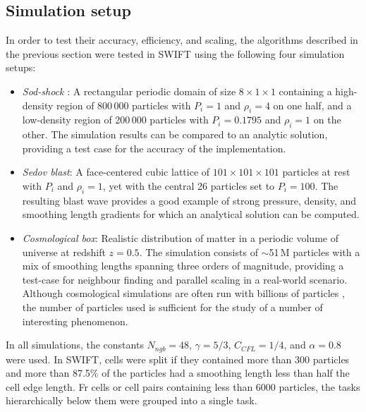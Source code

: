 \documentclass[final]{siamltex}
\begin{document}
\subsection{Simulation setup}

In order to test their accuracy, efficiency, and scaling,
the algorithms described in the previous section
were tested in SWIFT using the following four
simulation setups:
%
\begin{itemize}
    \item {\em Sod-shock} \cite{ref:Sod1978}: A rectangular periodic
        domain of size $8\times 1 \times 1$ containing a
        high-density region of
        800\,000 particles with $P_i=1$ and $\rho_i=4$ on one half,
        and a low-density region of 200\,000
        particles with $P_i=0.1795$ and $\rho_i=1$ on the other.
        The simulation results can be compared to an analytic
        solution, providing a test case for the accuracy of the
        implementation.
    \item {\em Sedov blast}: A face-centered cubic lattice of
        $101\times 101\times 101$
        particles at rest with $P_i$ and $\rho_i=1$, yet with the
        central 26 particles set to
        $P_i=100$.
        The resulting blast wave provides a good example of
        strong pressure, density, and smoothing length gradients
        for which an analytical solution can be computed.
    \item {\em Cosmological box}: Realistic distribution of matter
        in a periodic volume of universe at redshift $z=0.5$.
        The simulation consists
        of $\sim$51\,M particles with
        a mix of smoothing lengths spanning three orders of magnitude,
        providing a test-case for neighbour finding and parallel
        scaling in a real-world scenario.
        Although cosmological simulations are often run with
        billions of particles \cite{ref:Springel2005}, the number of
        particles used is sufficient for the study of a number of
        interesting phenomenon.
\end{itemize}
%
In all simulations, the constants $N_{ngb}=48$, $\gamma=5/3$,
$C_{CFL}=1/4$, and $\alpha = 0.8$ were used.
In SWIFT, cells were split if they contained more than 300
particles and more than 87.5\% of the particles had a smoothing
length less than half the cell edge length.
Fr cells or cell pairs containing less than 6000 particles, the
tasks hierarchically below them were grouped into a single task.
\end{document}
